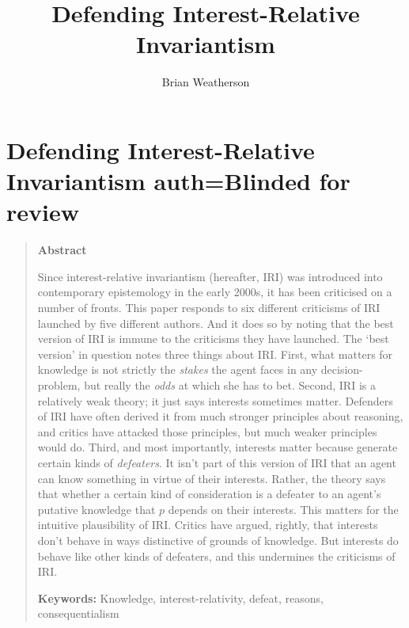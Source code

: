 \documentclass[oneside]{book}
\title{Defending Interest-Relative Invariantism}
\author{Brian Weatherson}
\begin{document}



\setcounter{paper}{0}

\chapter[Defending IRI]{Defending Interest-Relative Invariantism auth=Blinded for review}

\begin{quote}
\textbf{Abstract}

Since interest-relative invariantism (hereafter, IRI) was introduced into contemporary epistemology in the early 2000s, it has been criticised on a number of fronts. This paper responds to six different criticisms of IRI launched by five different authors. And it does so by noting that the best version of IRI is immune to the criticisms they have launched. The `best version' in question notes three things about IRI. First, what matters for knowledge is not strictly the \textit{stakes} the agent faces in any decision-problem, but really the \textit{odds} at which she has to bet. Second, IRI is a relatively weak theory; it just says interests sometimes matter. Defenders of IRI have often derived it from much stronger principles about reasoning, and critics have attacked those principles, but much weaker principles would do. Third, and most importantly, interests matter because generate certain kinds of \textit{defeaters}. It isn't part of this version of IRI that an agent can know something in virtue of their interests. Rather, the theory says that whether a certain kind of consideration is a defeater to an agent's putative knowledge that $p$ depends on their interests. This matters for the intuitive plausibility of IRI. Critics have argued, rightly, that interests don't behave in ways distinctive of grounds of knowledge. But interests do behave like other kinds of defeaters, and this undermines the criticisms of IRI.

\textbf{Keywords:} Knowledge, interest-relativity, defeat, reasons, consequentialism

\end{quote}
\end{document}
